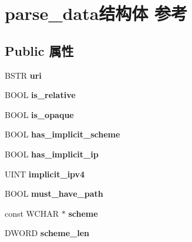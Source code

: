 \hypertarget{structparse__data}{}\section{parse\+\_\+data结构体 参考}
\label{structparse__data}
\subsection*{Public 属性}
\begin{DoxyCompactItemize}
\item 
\mbox{\label{structparse__data_a9ff80677ea000a9baa4161b309d919b8}} 
B\+S\+TR {\bfseries uri}
\item 
\mbox{\label{structparse__data_aa59a0711cadec3a580186326508854ab}} 
B\+O\+OL {\bfseries is\+\_\+relative}
\item 
\mbox{\label{structparse__data_aa93fc221d441c98ad1a9b5db596e97e8}} 
B\+O\+OL {\bfseries is\+\_\+opaque}
\item 
\mbox{\label{structparse__data_a5ea556ee2e3342c8ef28296bcd1af8f7}} 
B\+O\+OL {\bfseries has\+\_\+implicit\+\_\+scheme}
\item 
\mbox{\label{structparse__data_aee6ceb029b0c8c9c383683aaa0ed41ac}} 
B\+O\+OL {\bfseries has\+\_\+implicit\+\_\+ip}
\item 
\mbox{\label{structparse__data_a8bb6418ae65f5c43540feaf96c985b4d}} 
U\+I\+NT {\bfseries implicit\+\_\+ipv4}
\item 
\mbox{\label{structparse__data_ab1a9173845a210b208f01a265baead15}} 
B\+O\+OL {\bfseries must\+\_\+have\+\_\+path}
\item 
\mbox{\label{structparse__data_aad71e14948af29cd892aacc80b61a62a}} 
const W\+C\+H\+AR $\ast$ {\bfseries scheme}
\item 
\mbox{\label{structparse__data_ae10545f2d7b86f866d0ffab6175616dd}} 
D\+W\+O\+RD {\bfseries scheme\+\_\+len}
\item 
\mbox{\label{structparse__data_a60893022d4b5dbb3164b92a6f438aea1}} 

\end{DoxyCompactItemize}
